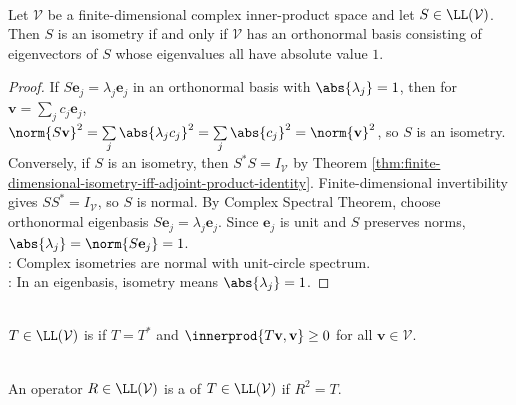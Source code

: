 \begin{theorem} \label{thm:complex-isometry-description} \\
Let $\mathcal{V}$ be a finite-dimensional complex inner-product space and let $S\in\LL(\mathcal{V})$. Then $S$ is an isometry if and only if $\mathcal{V}$ has an orthonormal basis consisting of eigenvectors of $S$ whose eigenvalues all have absolute value $1$.
\begin{proof}
If $S\mathbf{e}_j=\lambda_j\mathbf{e}_j$ in an orthonormal basis with $\abs{\lambda_j}=1$, then for $\mathbf{v}=\sum_j c_j\mathbf{e}_j$,\\
$\norm{S\mathbf{v}}^2=\sum\limits_j\abs{\lambda_jc_j}^2=\sum\limits_j\abs{c_j}^2=\norm{\mathbf{v}}^2$, so $S$ is an isometry. Conversely, if $S$ is an isometry, then $S^*S=I_{\mathcal{V}}$ by Theorem \ref{thm:finite-dimensional-isometry-iff-adjoint-product-identity}. Finite-dimensional invertibility gives $SS^*=I_{\mathcal{V}}$, so $S$ is normal. By Complex Spectral Theorem, choose orthonormal eigenbasis $S\mathbf{e}_j=\lambda_j\mathbf{e}_j$. Since $\mathbf{e}_j$ is unit and $S$ preserves norms, $\abs{\lambda_j}=\norm{S\mathbf{e}_j}=1$.\\
: Complex isometries are normal with unit-circle spectrum.\\
: In an eigenbasis, isometry means $\abs{\lambda_j}=1$.
\end{proof}
\end{theorem}

\begin{definition} \label{def:positive-operator} \\
$T\in\LL(\mathcal{V})$ is  if $T=T^*$ and $\innerprod{T\mathbf{v},\mathbf{v}}\geq0$ for all $\mathbf{v}\in\mathcal{V}$.
\end{definition}

\begin{definition} \label{def:square-root-operator} \\
An operator $R\in\LL(\mathcal{V})$ is a  of $T\in\LL(\mathcal{V})$ if $R^2=T$.
\end{definition}

